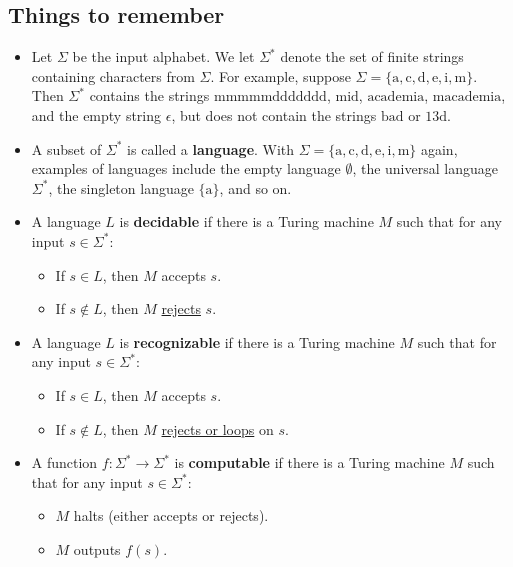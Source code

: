 \documentclass[10pt]{article}
\date{}
\begin{document}
		
\subsection*{Things to remember}


\begin{itemize}
	\item Let $\Sigma$ be the input alphabet. We let $\Sigma^*$ denote the set of finite strings containing characters from $\Sigma$.  For example, suppose $\Sigma = \{\mathrm{a}, \mathrm{c}, \mathrm{d}, \mathrm{e}, \mathrm{i}, \mathrm{m}\}$. Then  $\Sigma^*$ contains the strings $\mathrm{mmmmmddddddd}$, $\mathrm{mid}$, $\mathrm{academia}$, $\mathrm{macademia}$, and the empty string $\epsilon$, but does not contain the strings $\mathrm{bad}$ or $\mathrm{13d}$.
	\item A subset of $\Sigma^*$ is called a \textbf{language}. With $\Sigma = \{\mathrm{a}, \mathrm{c}, \mathrm{d}, \mathrm{e}, \mathrm{i}, \mathrm{m}\}$ again, examples of languages include the empty language $\emptyset$, the universal language  $\Sigma^*$, the singleton language $\{\mathrm{a}\}$, and so on.
	\item A language $L$ is \textbf{decidable} if there is a Turing machine $M$ such that for any input $s \in \Sigma^*$:
	\begin{itemize}
		\item If $s \in L$, then $M$ accepts $s$.
		\item If $s \notin L$, then $M$ \underline{rejects} $s$.
	\end{itemize}
	\item A language $L$ is \textbf{recognizable} if there is a Turing machine $M$ such that for any input $s \in \Sigma^*$:
	\begin{itemize}
		\item If $s \in L$, then $M$ accepts $s$.
		\item If $s \notin L$, then $M$ \underline{rejects or loops} on $s$.
	\end{itemize}
	\item A function $f: \Sigma^* \to \Sigma^*$ is \textbf{computable} if there is a Turing machine $M$ such that for any input $s \in \Sigma^*$:
	\begin{itemize}
		\item $M$ halts (either accepts or rejects).
		\item $M$ outputs $f(s)$.
	\end{itemize}
\end{itemize}
\end{document}
